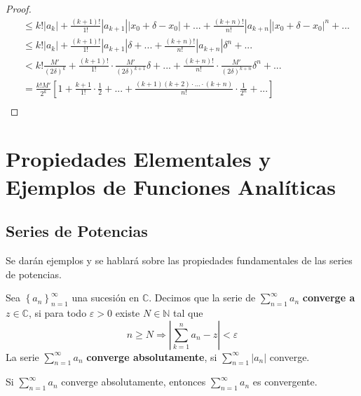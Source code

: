 \documentclass[12pt]{report}
\theoremstyle{largebreak}
\newcommand\abs[1]{\ensuremath{\left|#1\right|}}
\begin{document}
\begin{proof}
\begin{equation*}
\begin{split}
                &\leq k!\abs{a_k}+\frac{(k+1)!}{1!}\abs{a_{ k+1}}\abs{x_0+\delta-x_0}+...+\frac{(k+n)!}{n!}\abs{a_{ k+n}}\abs{x_0+\delta-x_0}^n+...\\
                &\leq k!\abs{a_k}+\frac{(k+1)!}{1!}\abs{a_{ k+1}}\delta+...+\frac{(k+n)!}{n!}\abs{a_{ k+n}}\delta^n+...\\
                &< k!\frac{M'}{(2\delta)^k}+\frac{(k+1)!}{1!}\cdot\frac{M'}{(2\delta)^{ k+1}}\delta+...+\frac{(k+n)!}{n!}\cdot\frac{M'}{(2\delta)^{ k+n}}\delta^n+...\\
                &=\frac{k!M'}{2^k}\left[1+\frac{k+1}{1!}\cdot\frac{1}{2}+...+\frac{(k+1)(k+2)\cdot...\cdot(k+n)}{n!}\cdot\frac{1}{2^n}+... \right]\\
            \end{split}
        \end{equation*}

    \end{proof}

    \chapter{Propiedades Elementales y Ejemplos de Funciones Analíticas}
    
    \section{Series de Potencias}

    Se darán ejemplos y se hablará sobre las propiedades fundamentales de las series de potencias.

    \begin{mydef}
        Sea $\left\{ a_n \right\}_{ n=1}^\infty$ una sucesión en $\mathbb{C}$. Decimos que la serie de $\sum_{n=1}^\infty a_n$ \textbf{converge a $z\in\mathbb{C}$}, si para todo $\varepsilon>0$ existe $N\in\mathbb{N}$ tal que
        \begin{equation*}
            n\geq N\Rightarrow\abs{\sum_{ k=1}^na_n-z }<\varepsilon
        \end{equation*}
        La serie $\sum_{n=1}^\infty a_n$ \textbf{converge absolutamente}, si $\sum_{n=1}^\infty\abs{a_n}$ converge.
    \end{mydef}

    \begin{propo}
        Si $\sum_{n=1}^\infty a_n$ converge absolutamente, entonces $\sum_{n=1}^\infty a_n$ es convergente.
    \end{propo}
\end{document}
